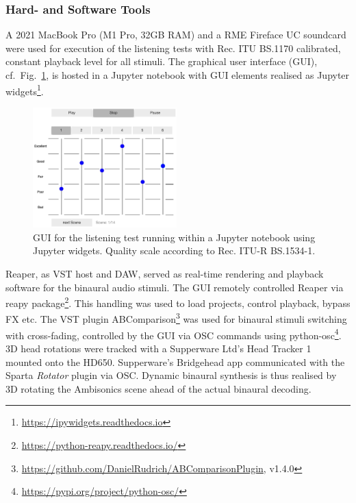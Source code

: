 \documentclass[conference]{IEEEtran}
\begin{document}
\subsubsection{Hard- and Software Tools}
%
A 2021 MacBook Pro (M1 Pro, 32GB RAM) and a RME Fireface UC soundcard were used for execution of the listening tests with Rec. ITU BS.1170 calibrated, constant playback level for all stimuli.
%
The graphical user interface (GUI), cf.~Fig.~\ref{fig:gui}, is hosted in a Jupyter notebook with GUI elements realised as Jupyter widgets\footnote{\url{https://ipywidgets.readthedocs.io}}.
%
\begin{figure}[t!]
\centering
\includegraphics[width=0.495\textwidth]{../graphics/GUI.png}
\caption{GUI for the listening test running within a Jupyter notebook using Jupyter widgets. Quality scale according to Rec. ITU-R BS.1534-1.}
\label{fig:gui}
\end{figure}
%
Reaper, as VST host and DAW, served as real-time rendering and playback software for the binaural audio stimuli.
%
The GUI remotely controlled Reaper via reapy package\footnote{\url{https://python-reapy.readthedocs.io/}}.
%
This handling was used to load projects, control playback, bypass FX etc.
%
The VST plugin ABComparison\footnote{\url{https://github.com/DanielRudrich/ABComparisonPlugin}, v1.4.0} was used for binaural stimuli switching with cross-fading, controlled by the GUI via OSC commands using python-osc\footnote{\url{https://pypi.org/project/python-osc/}}.
%
3D head rotations were tracked with a Supperware Ltd's Head Tracker 1 mounted onto the HD650.
%
Supperware's Bridgehead app communicated with the Sparta \textit{Rotator} plugin via OSC.
%
Dynamic binaural synthesis is thus realised by 3D rotating the Ambisonics scene ahead of the actual binaural decoding.
\end{document}
